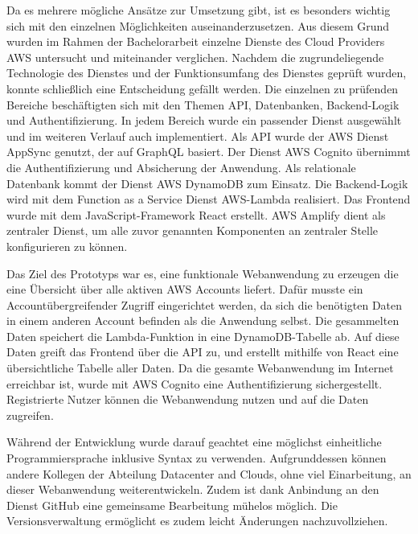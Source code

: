 Da es mehrere mögliche Ansätze zur Umsetzung gibt, ist es besonders wichtig sich mit den einzelnen Möglichkeiten auseinanderzusetzen.
Aus diesem Grund wurden im Rahmen der Bachelorarbeit einzelne Dienste des Cloud Providers AWS untersucht und miteinander verglichen.
Nachdem die zugrundeliegende Technologie des Dienstes und der Funktionsumfang des Dienstes geprüft wurden, konnte schließlich eine Entscheidung gefällt werden.
Die einzelnen zu prüfenden Bereiche beschäftigten sich mit den Themen API, Datenbanken, Backend-Logik und Authentifizierung.
In jedem Bereich wurde ein passender Dienst ausgewählt und im weiteren Verlauf auch implementiert.
Als API wurde der AWS Dienst AppSync genutzt, der auf GraphQL basiert.
Der Dienst AWS Cognito übernimmt die Authentifizierung und Absicherung der Anwendung.
Als relationale Datenbank kommt der Dienst AWS DynamoDB zum Einsatz.
Die Backend-Logik wird mit dem Function as a Service Dienst AWS-Lambda realisiert.
Das Frontend wurde mit dem JavaScript-Framework React erstellt.
AWS Amplify dient als zentraler Dienst, um alle zuvor genannten Komponenten an zentraler Stelle konfigurieren zu können.

Das Ziel des Prototyps war es, eine funktionale Webanwendung zu erzeugen die eine Übersicht über alle aktiven AWS Accounts liefert.
Dafür musste ein Accountübergreifender Zugriff eingerichtet werden, da sich die benötigten Daten in einem anderen Account befinden als die Anwendung selbst.
Die gesammelten Daten speichert die Lambda-Funktion in eine DynamoDB-Tabelle ab.
Auf diese Daten greift das Frontend über die API zu, und erstellt mithilfe von React eine übersichtliche Tabelle aller Daten.
Da die gesamte Webanwendung im Internet erreichbar ist, wurde mit AWS Cognito eine Authentifizierung sichergestellt.
Registrierte Nutzer können die Webanwendung nutzen und auf die Daten zugreifen.

Während der Entwicklung wurde darauf geachtet eine möglichst einheitliche Programmiersprache inklusive Syntax zu verwenden.
Aufgrunddessen können andere Kollegen der Abteilung Datacenter and Clouds, ohne viel Einarbeitung, an dieser Webanwendung weiterentwickeln.
Zudem ist dank Anbindung an den Dienst GitHub eine gemeinsame Bearbeitung mühelos möglich.
Die Versionsverwaltung ermöglicht es zudem leicht Änderungen nachzuvollziehen.








